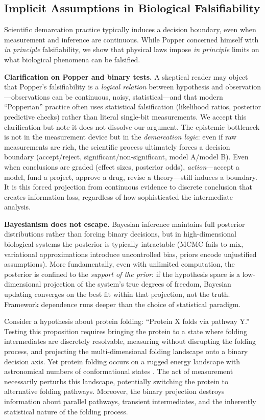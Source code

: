 \documentclass[12pt]{article}
\begin{document}
\subsection{Implicit Assumptions in Biological Falsifiability}

Scientific demarcation practice typically induces a decision boundary, even when measurement and inference are continuous. While Popper concerned himself with \textit{in principle} falsifiability, we show that physical laws impose \textit{in principle} limits on what biological phenomena can be falsified.

\textbf{Clarification on Popper and binary tests.} A skeptical reader may object that Popper's falsifiability is a \emph{logical relation} between hypothesis and observation---observations can be continuous, noisy, statistical---and that modern ``Popperian'' practice often uses statistical falsification (likelihood ratios, posterior predictive checks) rather than literal single-bit measurements. We accept this clarification but note it does not dissolve our argument. The epistemic bottleneck is not in the measurement device but in the \emph{demarcation logic}: even if raw measurements are rich, the scientific process ultimately forces a decision boundary (accept/reject, significant/non-significant, model A/model B). Even when conclusions are graded (effect sizes, posterior odds), \emph{action}---accept a model, fund a project, approve a drug, revise a theory---still induces a boundary. It is this forced projection from continuous evidence to discrete conclusion that creates information loss, regardless of how sophisticated the intermediate analysis.

\textbf{Bayesianism does not escape.} Bayesian inference maintains full posterior distributions rather than forcing binary decisions, but in high-dimensional biological systems the posterior is typically intractable (MCMC fails to mix, variational approximations introduce uncontrolled bias, priors encode unjustified assumptions). More fundamentally, even with unlimited computation, the posterior is confined to the \emph{support of the prior}: if the hypothesis space is a low-dimensional projection of the system's true degrees of freedom, Bayesian updating converges on the best fit within that projection, not the truth. Framework dependence runs deeper than the choice of statistical paradigm.

Consider a hypothesis about protein folding: ``Protein X folds via pathway Y.'' Testing this proposition requires bringing the protein to a state where folding intermediates are discretely resolvable, measuring without disrupting the folding process, and projecting the multi-dimensional folding landscape onto a binary decision axis. Yet protein folding occurs on a rugged energy landscape with astronomical numbers of conformational states \cite{dill2012}. The act of measurement necessarily perturbs this landscape, potentially switching the protein to alternative folding pathways. Moreover, the binary projection destroys information about parallel pathways, transient intermediates, and the inherently statistical nature of the folding process.
\end{document}

